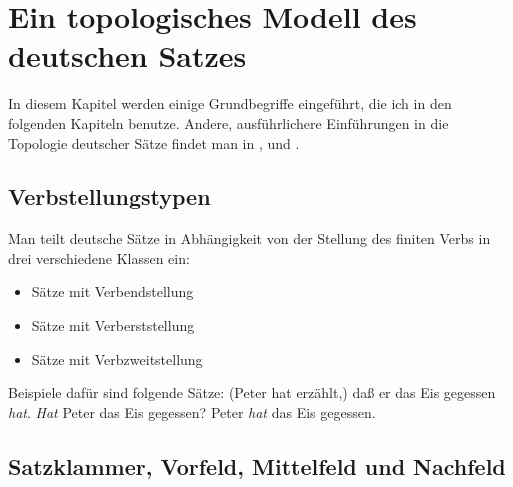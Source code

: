 

\chapter{Ein topologisches Modell des deutschen Satzes}
\label{topo}

%
In diesem Kapitel werden einige Grundbegriffe eingeführt, die ich in den folgenden
Kapiteln benutze. 
Andere, ausführlichere Einführungen in die Topologie deutscher Sätze
findet man in ,  und .

\section{Verbstellungstypen}

Man teilt deutsche Sätze in Abhängigkeit von der Stellung des finiten Verbs 
in drei verschiedene Klassen ein:
\begin{itemize}
\item Sätze mit Verbendstellung
\item Sätze mit Verberststellung
\item Sätze mit Verbzweitstellung
\end{itemize}
Beispiele dafür sind folgende Sätze:
\eal
\ex (Peter hat erzählt,) daß er das Eis gegessen \emph{hat}.
\ex \emph{Hat} Peter das Eis gegessen?
\ex Peter \emph{hat} das Eis gegessen.
\zl

% 
%



\section{Satzklammer, Vorfeld, Mittelfeld und Nachfeld}


